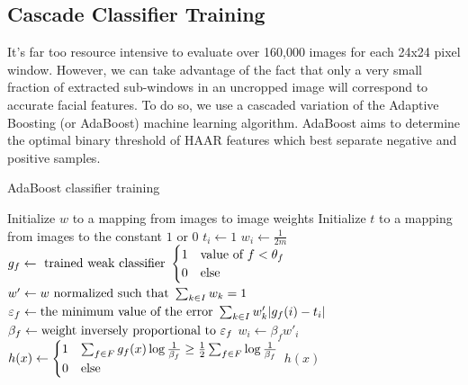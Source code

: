 \documentclass[journal]{IEEEtran}
\begin{document}
\subsection{Cascade Classifier Training}
It's far too resource intensive to evaluate over 160,000 images for each 24x24 pixel window. However, we can take advantage of the fact that only a very small fraction of extracted sub-windows in an uncropped image will correspond to accurate facial features. To do so, we use a cascaded variation of the Adaptive Boosting (or AdaBoost) machine learning algorithm. AdaBoost aims to determine the optimal binary threshold of HAAR features which best separate negative and positive samples.
\begin{algorithm}[]
	\smaller
	\label{adaboost-classifier-algorithm}
	\caption{AdaBoost classifier training}
	
	
	\nl Initialize $w$ to a mapping from images to image weights\;
	\nl Initialize $t$ to a mapping from images to the constant $1$ or $0$\;
	\nl {} {
		\nl {} {
			\nl $t_i \gets 1$\;
			\nl $w_i \gets \frac{1}{2m}$\;
		}
		\nl {}
	}
	\nl {} {
	\nl $g_f \gets \textnormal{ trained weak classifier  } \begin{cases}1 & \textnormal{value of } f < \theta_f \\ 0 & \textnormal{else}\end{cases}$\;
		\nl {} {
			\nl $w' \gets w \textnormal{ normalized such that } \sum_{k \in I} w_k = 1$\;
			\nl $\varepsilon_f \gets \textnormal{the minimum value of the error } \sum_{k \in I} w'_k |g_f(i) - t_i|$\;
			\nl $\beta_f \gets \textnormal{weight inversely proportional to } \varepsilon_f$\;
			\nl $w_i \gets \beta_f w'_i$\;
		}
	}
	\nl $h(x) \gets \begin{cases}1 & \sum_{f \in F} g_f(x) \log{\frac{1}{\beta_f}} \geq \frac{1}{2} \sum_{f \in F} \log{\frac{1}{\beta_f}} \\ 0 & \textnormal{else}\end{cases}$\;
	\nl \Return $h(x)$\;
	\
\end{algorithm}
\end{document}
